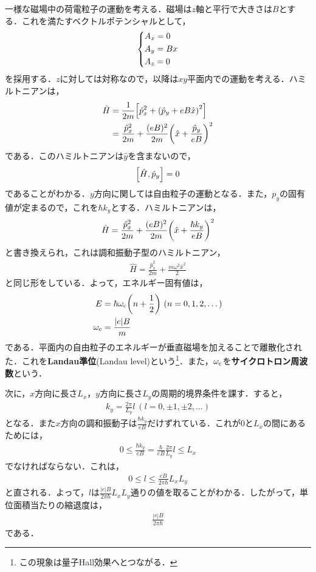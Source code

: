 \documentclass{report}
\begin{document}
  一様な磁場中の荷電粒子の運動を考える．磁場は$z$軸と平行で大きさは$B$とする．これを満たすベクトルポテンシャルとして，
  \begin{align}
    \begin{dcases}
      A_x = 0\\
      A_y = Bx\\
      A_z = 0
    \end{dcases}
  \end{align}
  を採用する．$z$に対しては対称なので，以降は$xy$平面内での運動を考える．ハミルトニアンは，
  \begin{align}
    \hat{H} &= \frac{1}{2m}\qty[\hat{p}_x^2 + \qty(\hat{p}_y + eB\hat{x})^2]\\
    &= \frac{\hat{p}_x^2}{2m} + \frac{(eB)^2}{2m}\qty(\hat{x} + \frac{\hat{p}_y}{eB})^2
  \end{align}
  である．このハミルトニアンは$\hat{y}$を含まないので，
  \begin{align}
    \qty[\hat{H}, \hat{p}_y] = 0
  \end{align}
  であることがわかる．$y$方向に関しては自由粒子の運動となる．また，$p_y$の固有値が定まるので，これを$\hbar k_y$とする．ハミルトニアンは，
  \begin{align}
    \hat{H} = \frac{\hat{p}_x^2}{2m} + \frac{(eB)^2}{2m}\qty(\hat{x} + \frac{\hbar k_y}{eB})^2
  \end{align}
  と書き換えられ，これは調和振動子型のハミルトニアン，
  \begin{align}
    \hat{H} = \frac{\hat{p}_x^2}{2m} + \frac{m\omega^2\hat{x}^2}{2}
  \end{align}
  と同じ形をしている．よって，エネルギー固有値は，
  \begin{align}
    E &= \hbar\omega_{\mathrm{c}} \qty(n + \frac{1}{2})\ (n = 0,1,2,\dots)\\
    \omega_{\mathrm{c}} &= \frac{\abs{e}B}{m}
  \end{align}
  である．平面内の自由粒子のエネルギーが垂直磁場を加えることで離散化された．これを\textbf{Landau準位}(Landau level)という\footnote{この現象は量子Hall効果へとつながる．}．また，$\omega_{\mathrm{c}}$を\textbf{サイクロトロン周波数}という．
  \par
  次に，$x$方向に長さ$L_x$，$y$方向に長さ$L_y$の周期的境界条件を課す．すると，
  \begin{align}
    k_y = \frac{2\pi}{L_y}l\ (l = 0,\pm 1, \pm2,\dots)
  \end{align}
  となる．また$x$方向の調和振動子は$\frac{\hbar k_y}{eB}$だけずれている．これが0と$L_x$の間にあるためには，
  \begin{align}
    0 \leq \frac{\hbar k_y}{eB} = \frac{\hbar}{eB} \frac{2\pi}{L_y}l \leq L_x
  \end{align}
  でなければならない．これは，
  \begin{align}
    0 \leq l \leq \frac{eB}{2\pi\hbar}L_xL_y
  \end{align}
  と直される．よって，$l$は$\frac{|e|B}{2\pi\hbar}L_xL_y$通りの値を取ることがわかる．したがって，単位面積当たりの縮退度は，
  \begin{align}
    \frac{|e|B}{2\pi\hbar}
  \end{align}
  である．
\end{document}

